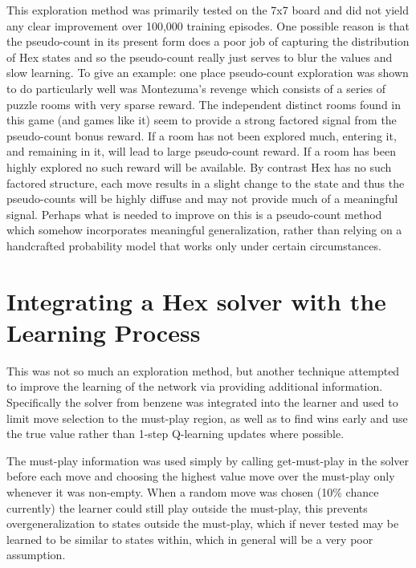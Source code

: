 \documentclass{article}
\begin{document}
This exploration method was primarily tested on the 7x7 board and did not yield any clear improvement over 100,000 training episodes. One possible reason is that the pseudo-count in its present form does a poor job of capturing the distribution of Hex states and so the pseudo-count really just serves to blur the values and slow learning. To give an example: one place pseudo-count exploration was shown to do particularly well was Montezuma's revenge which consists of a series of puzzle rooms with very sparse reward. The independent distinct rooms found in this game (and games like it) seem to provide a strong factored signal from the pseudo-count bonus reward. If a room has not been explored much, entering it, and remaining in it, will lead to large pseudo-count reward. If a room has been highly explored no such reward will be available. By contrast Hex has no such factored structure, each move results in a slight change to the state and thus the pseudo-counts will be highly diffuse and may not provide much of a meaningful signal. Perhaps what is needed to improve on this is a pseudo-count method which somehow incorporates meaningful generalization, rather than relying on a handcrafted probability model that works only under certain circumstances.

\section*{Integrating a Hex solver with the Learning Process}
This was not so much an exploration method, but another technique attempted to improve the learning of the network via providing additional information. Specifically the solver from benzene was integrated into the learner and used to limit move selection to the must-play region, as well as to find wins early and use the true value rather than 1-step Q-learning updates where possible. 

The must-play information was used simply by calling get-must-play in the solver before each move and choosing the highest value move over the must-play only whenever it was non-empty. When a random move was chosen (10\% chance currently) the learner could still play outside the must-play, this prevents overgeneralization to states outside the must-play, which if never tested may be learned to be similar to states within, which in general will be a very poor assumption. 
\end{document}
